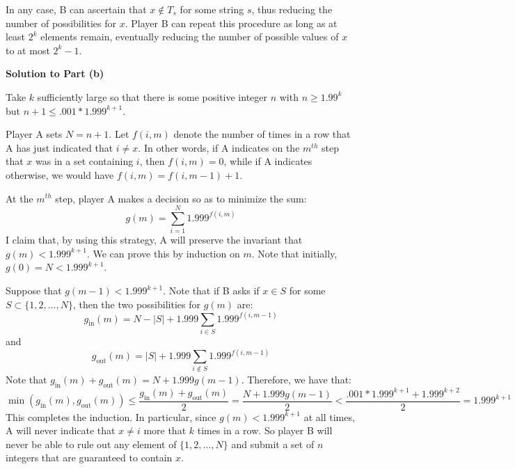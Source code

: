 \begin{problem}
In any case, B can ascertain that $x \not \in T_s$ for some string $s$, thus reducing the number of possibilities for $x$. Player B can repeat this procedure as long as at least $2^k$ elements remain, eventually reducing the number of possible values of $x$ to at most $2^k - 1$.

\textbf{Solution to Part (b)}

Take $k$ sufficiently large so that there is some positive integer $n$ with $n \ge 1.99^k$ but $n+1 \le .001*1.999^{k+1}$.

Player A sets $N=n+1$. Let $f(i,m)$ denote the number of times in a row that A has just indicated that $i \neq x$. In other words, if A indicates on the $m^{th}$ step that $x$ was in a set containing $i$, then $f(i,m)=0$, while if A indicates otherwise, we would have $f(i,m)=f(i,m-1)+1$.

At the $m^{th}$ step, player A makes a decision so as to minimize the sum:\[g(m)=\sum_{i=1}^N 1.999^{f(i,m)}\]I claim that, by using this strategy, A will preserve the invariant that $g(m) < 1.999^{k+1}$. We can prove this by induction on $m$. Note that initially, $g(0)=N<1.999^{k+1}$.

Suppose that $g(m-1) < 1.999^{k+1}$. Note that if B asks if $x \in S$ for some $S \subset \{1,2,\dots,N\}$, then the two possibilities for $g(m)$ are:\[g_\text{in}(m)=N-|S|+1.999\sum_{i \in S} 1.999^{f(i,m-1)}\]and\[g_\text{out}(m)=|S|+1.999\sum_{i \not \in S} 1.999^{f(i,m-1)}\]Note that $g_\text{in}(m)+g_\text{out}(m)=N + 1.999g(m-1)$. Therefore, we have that:\[\min(g_{\text{in}}(m), g_{\text{out}}(m)) \le \frac{g_{\text{in}}(m) + g_{\text{out}}(m)}{2} = \frac{N + 1.999g(m-1)}{2} < \frac{.001*1.999^{k+1} +1.999^{k+2}}{2} = 1.999^{k+1}\]
This completes the induction. In particular, since $g(m)<1.999^{k+1}$ at all times, A will never indicate that $x\neq i$ more that $k$ times in a row. So player B will never be able to rule out any element of $\{1,2,\dots,N\}$ and submit a set of $n$ integers that are guaranteed to contain $x$.

\end{problem}

